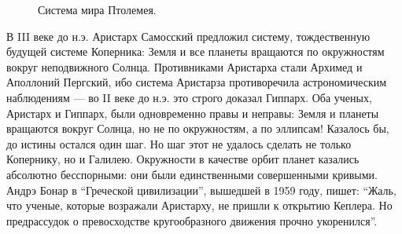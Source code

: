\documentclass[twocolumn,10pt]{article}
\begin{document}
\begin{figure}[ht]
\begin{center}
\end{center}
\caption{Система мира Птолемея.}
\end{figure}

В III веке до н.э. Аристарх Самосский предложил систему, тождественную будущей системе Коперника: Земля и все планеты вращаются по окружностям вокруг неподвижного Солнца. Противниками Аристарха стали Архимед и Аполлоний Пергский, ибо система Аристарза противоречила астрономическим наблюдениям --- во II веке до н.э. это строго доказал Гиппарх. Оба ученых, Аристарх и Гиппарх, были одновременно правы и неправы: Земля и планеты вращаются вокруг Солнца, но не по окружностям, а по эллипсам! Казалось бы, до истины остался один шаг. Но шаг этот не удалось сделать не только Копернику, но и Галилею. Окружности в качестве орбит планет казались абсолютно бесспорными: они были единственными совершенными кривыми. Андрэ Бонар в ``Греческой цивилизации'', вышедшей в 1959 году, пишет: ``Жаль, что ученые, которые возражали Аристарху, не пришли к открытию Кеплера. Но предрассудок о превосходстве кругообразного движения прочно укоренился''.
\end{document}
